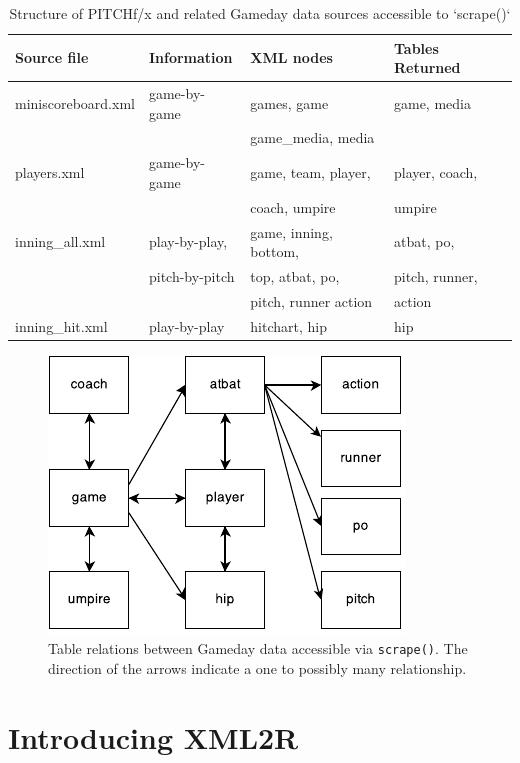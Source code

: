 \documentclass[12pt,]{isuthesis}
\begin{document}
\begin{table}

\caption{\label{tab:pitchfx}Structure of PITCHf/x and related Gameday data sources accessible to `scrape()`}
\centering
\begin{tabular}[t]{llll}
\toprule
Source file & Information & XML nodes & Tables Returned\\
\midrule
miniscoreboard.xml & game-by-game & games, game & game, media\\
 &  & game\_media, media & \\
players.xml & game-by-game & game, team, player, & player, coach,\\
 &  & coach, umpire & umpire\\
inning\_all.xml & play-by-play, & game, inning, bottom, & atbat, po,\\
\addlinespace
 & pitch-by-pitch & top, atbat, po, & pitch, runner,\\
 &  & pitch, runner action & action\\
inning\_hit.xml & play-by-play & hitchart, hip & hip\\
\bottomrule
\end{tabular}
\end{table}

\begin{figure}[htbp]
\centering
\includegraphics{images/Drawing1.pdf}
\caption{\label{fig:relations}Table relations between Gameday data
accessible via \texttt{scrape()}. The direction of the arrows indicate a
one to possibly many relationship.}
\end{figure}

\section{Introducing XML2R}\label{introducing-xml2r}
\end{document}
